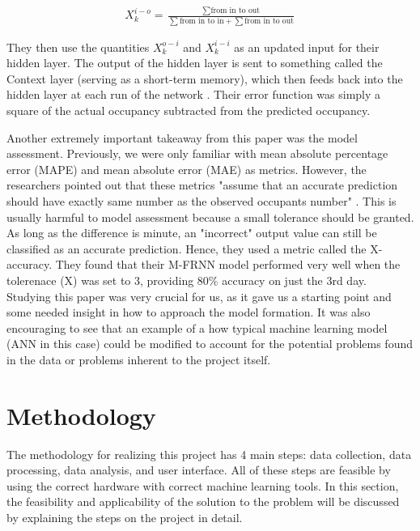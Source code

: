 \documentclass[journal, 12pt]{IEEEtran}
\begin{document}
\begin{equation}
    \begin{split}
        X_{k}^{i-o} = \frac{\sum{\text{from in to out}}}{\sum{\text{from in to in}} + \sum{\text{from in to out}}}
    \end{split}
    \label{eq:}
\end{equation}

\medskip
\noindent They then use the quantities $X_{k}^{o-i}$ and $X_{k}^{i-i}$ as an updated input for their hidden layer. The output of the hidden layer is sent to something called the Context layer (serving as a short-term memory), which then feeds back into the hidden layer at each run of the network \cite{wang2018occupancy}. Their error function was simply a square of the actual occupancy subtracted from the predicted occupancy\cite{wang2018occupancy}.

\noindent Another extremely important takeaway from this paper was the model assessment. Previously, we were only familiar with mean absolute percentage error (MAPE) and mean absolute error (MAE) as metrics. However, the researchers pointed out that these metrics "assume that an accurate prediction should have exactly
same number as the observed occupants number" \cite{wang2018occupancy}. This is usually harmful to model assessment because a small tolerance should be granted. As long as the difference is minute, an "incorrect" output value can still be classified as an accurate prediction. Hence, they used a metric called the X-accuracy. They found that their M-FRNN model performed very well when the tolerenace (X) was set to 3, providing 80\% accuracy on just the 3rd day. \\

\noindent Studying this paper was very crucial for us, as it gave us a starting point and some needed insight in how to approach the model formation. It was also encouraging to see that an example of a how typical machine learning model (ANN in this case) could be modified to account for the potential problems found in the data or problems inherent to the project itself. 



\section{Methodology}
\noindent The methodology for realizing this project has 4 main steps: data collection, data processing, data analysis, and user interface. All of these steps are feasible by using the correct hardware with correct machine learning tools. In this section, the feasibility and applicability of the solution to the problem will be discussed by explaining the steps on the project in detail.
\end{document}
